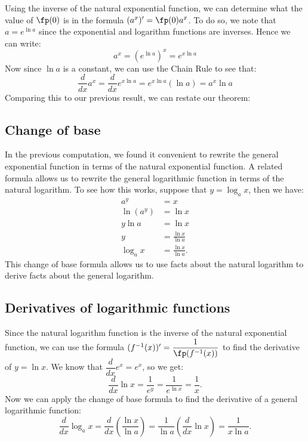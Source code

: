 Using the inverse of the natural exponential function, we can determine what the value of $\fp(0)$ is in the formula $(a^x)'=\fp(0)a^x$. To do so, we note that $a=e^{\ln a}$ since the exponential and logarithm functions are inverses. Hence we can write:
\[a^x=\left(e^{\ln a}\right)^x=e^{x\ln a}\]
Now since $\ln a$ is a constant, we can use the Chain Rule to see that:
\[\frac d{dx} a^x=\frac d{dx} e^{x\ln a} =e^{x\ln a}(\ln a) =a^x\ln a\]
Comparing this to our previous result, we can restate our theorem:


\subsection*{Change of base}

In the previous computation, we found it convenient to rewrite the general exponential function in terms of the natural exponential function. A related formula allows us to rewrite the general logarithmic function in terms of the natural logarithm.  To see how this works, suppose that $y=\log_ax$, then we have:
\begin{align*}
a^y&=x \\
\ln(a^y)&=\ln x\\
y\ln a&=\ln x\\
y&=\frac{\ln x}{\ln a}\\
\log_a x&=\frac{\ln x}{\ln a}.
\end{align*}
This change of base formula allows us to use facts about the natural logarithm to derive facts about the general logarithm.

\subsection*{Derivatives of logarithmic functions}

Since the natural logarithm function is the inverse of the natural exponential function, we can use the formula $(f^{-1}(x))'=\dfrac1{\fp(f^{-1}(x))}$ to find the derivative of $y=\ln x$. We know that $\dfrac d{dx}e^x=e^x$, so we get:
\[\frac d{dx}\ln x=\frac1{e^y}=\frac1{e^{\ln x}}=\frac1x.\]
Now we
can apply the change of base formula to find the derivative of a general logarithmic function:
\[\frac{d}{dx}\log_ax=\frac{d}{dx}\left(\frac{\ln x}{\ln a}\right) =\frac 1{\ln a}\left(\frac{d}{dx}\ln x\right)=\frac 1{x\ln a}.\]

